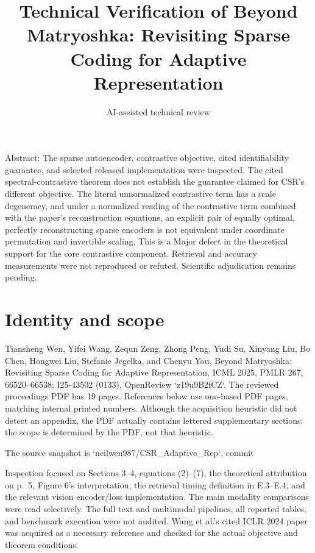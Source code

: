 \documentclass[10pt]{article}
\title{Technical Verification of
Beyond Matryoshka: Revisiting Sparse Coding for Adaptive Representation}
\author{AI-assisted technical review}
\date{}
\begin{document}
\maketitle
Abstract: The sparse autoencoder, contrastive objective, cited identifiability guarantee, and selected released implementation were inspected. The cited spectral-contrastive theorem does not establish the guarantee claimed for CSR’s different objective. The literal unnormalized contrastive term has a scale degeneracy, and under a normalized reading of the contrastive term combined with the paper’s reconstruction equations, an explicit pair of equally optimal, perfectly reconstructing sparse encoders is not equivalent under coordinate permutation and invertible scaling. This is a Major defect in the theoretical support for the core contrastive component. Retrieval and accuracy measurements were not reproduced or refuted. Scientific adjudication remains pending.\par
\section*{Identity and scope}
Tiansheng Wen, Yifei Wang, Zequn Zeng, Zhong Peng, Yudi Su, Xinyang Liu, Bo Chen, Hongwei Liu, Stefanie Jegelka, and Chenyu You, Beyond Matryoshka: Revisiting Sparse Coding for Adaptive Representation, ICML 2025, PMLR 267, 66520–66538; I25-43502 (0133), OpenReview `z19u9B2fCZ`. The reviewed proceedings PDF has 19 pages. References below use one-based PDF pages, matching internal printed numbers. Although the acquisition heuristic did not detect an appendix, the PDF actually contains lettered supplementary sections; the scope is determined by the PDF, not that heuristic.\par
The source snapshot is `neilwen987/CSR\_Adaptive\_Rep`, commit\par
Inspection focused on Sections 3–4, equations (2)–(7), the theoretical attribution on p. 5, Figure 6’s interpretation, the retrieval timing definition in E.3–E.4, and the relevant vision encoder/loss implementation. The main modality comparisons were read selectively. The full text and multimodal pipelines, all reported tables, and benchmark execution were not audited. Wang et al.’s cited ICLR 2024 paper was acquired as a necessary reference and checked for the actual objective and theorem conditions.\par
\end{document}

